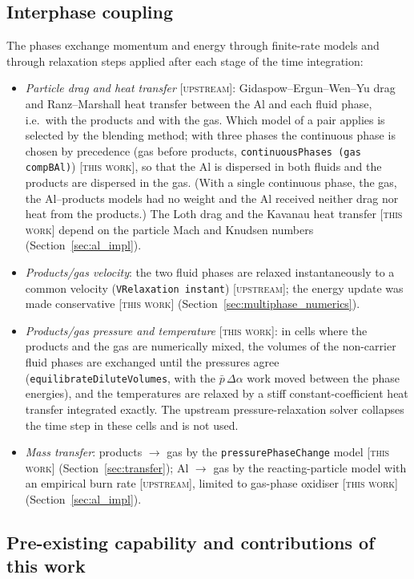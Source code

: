 \documentclass{article}
\newcommand{\up}{\textsc{[upstream]}}
\newcommand{\tw}{\textsc{[this work]}}
\begin{document}
\subsection{Interphase coupling}
\label{sec:coupling}

The phases exchange momentum and energy through finite-rate models and through relaxation steps applied after each stage of the time integration:
\begin{itemize}
    \item \emph{Particle drag and heat transfer} \up: Gidaspow--Ergun--Wen--Yu drag and Ranz--Marshall heat transfer between the Al and each fluid phase, i.e.\ with the products and with the gas. Which model of a pair applies is selected by the blending method; with three phases the continuous phase is chosen by precedence (gas before products, \texttt{continuousPhases (gas compBAl)}) \tw, so that the Al is dispersed in both fluids and the products are dispersed in the gas. (With a single continuous phase, the gas, the Al--products models had no weight and the Al received neither drag nor heat from the products.) The Loth drag and the Kavanau heat transfer \tw{} depend on the particle Mach and Knudsen numbers (Section~\ref{sec:al_impl}).
    \item \emph{Products/gas velocity}: the two fluid phases are relaxed instantaneously to a common velocity (\texttt{VRelaxation instant}) \up; the energy update was made conservative \tw{} (Section~\ref{sec:multiphase_numerics}).
    \item \emph{Products/gas pressure and temperature} \tw: in cells where the products and the gas are numerically mixed, the volumes of the non-carrier fluid phases are exchanged until the pressures agree (\texttt{equilibrateDiluteVolumes}, with the $\bar p\,\Delta\alpha$ work moved between the phase energies), and the temperatures are relaxed by a stiff constant-coefficient heat transfer integrated exactly. The upstream pressure-relaxation solver collapses the time step in these cells and is not used.
    \item \emph{Mass transfer}: products $\to$ gas by the \texttt{pressurePhaseChange} model \tw{} (Section~\ref{sec:transfer}); Al $\to$ gas by the reacting-particle model with an empirical burn rate \up, limited to gas-phase oxidiser \tw{} (Section~\ref{sec:al_impl}).
\end{itemize}

\subsection{Pre-existing capability and contributions of this work}
\label{sec:provenance}
\end{document}
